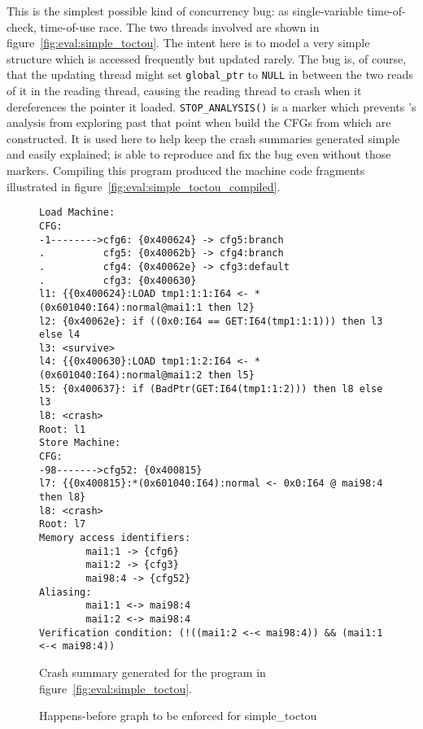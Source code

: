 This is the simplest possible kind of concurrency bug: as
single-variable time-of-check, time-of-use race.  The two threads
involved are shown in figure~\ref{fig:eval:simple_toctou}.  The intent
here is to model a very simple structure which is accessed frequently
but updated rarely.  The bug is, of course, that the updating thread
might set \verb|global_ptr| to \verb|NULL| in between the two reads of
it in the reading thread, causing the reading thread to crash when it
dereferences the pointer it loaded.  \verb|STOP_ANALYSIS()| is a
marker which prevents {\technique}'s analysis from exploring past that
point when build the CFGs from which {\StateMachines} are constructed.
It is used here to help keep the crash summaries generated simple and
easily explained; {\implementation} is able to reproduce and fix the
bug even without those markers.
Compiling this program produced the machine code fragments illustrated
in figure~\ref{fig:eval:simple_toctou_compiled}.

\begin{figure}
  \begin{minipage}{100mm}
\begin{verbatim}
Load Machine:
CFG:
-1-------->cfg6: {0x400624} -> cfg5:branch
.          cfg5: {0x40062b} -> cfg4:branch
.          cfg4: {0x40062e} -> cfg3:default
.          cfg3: {0x400630}
l1: {{0x400624}:LOAD tmp1:1:1:I64 <- *(0x601040:I64):normal@mai1:1 then l2}
l2: {0x40062e}: if ((0x0:I64 == GET:I64(tmp1:1:1))) then l3 else l4
l3: <survive>
l4: {{0x400630}:LOAD tmp1:1:2:I64 <- *(0x601040:I64):normal@mai1:2 then l5}
l5: {0x400637}: if (BadPtr(GET:I64(tmp1:1:2))) then l8 else l3
l8: <crash>
Root: l1
Store Machine:
CFG:
-98------->cfg52: {0x400815}
l7: {{0x400815}:*(0x601040:I64):normal <- 0x0:I64 @ mai98:4 then l8}
l8: <crash>
Root: l7
Memory access identifiers:
        mai1:1 -> {cfg6}
        mai1:2 -> {cfg3}
        mai98:4 -> {cfg52}
Aliasing:
        mai1:1 <-> mai98:4
        mai1:2 <-> mai98:4
Verification condition: (!((mai1:2 <-< mai98:4)) && (mai1:1 <-< mai98:4))
\end{verbatim}
  \end{minipage}
  \caption{Crash summary generated for the program in
    figure~\ref{fig:eval:simple_toctou}.}
  \label{fig:eval:simple_toctou_summary}
\end{figure}

\begin{figure}
  \caption{Happens-before graph to be enforced for simple\_toctou}
  \label{fig:eval:simple_toctou_hb_graph}
\end{figure}

